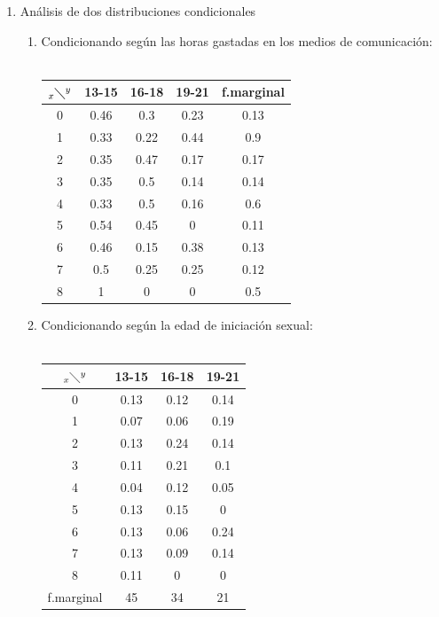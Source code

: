 \documentclass[letterpaper,spanish,11pt]{article}
\begin{document}
\begin{itemize}
\begin{enumerate}
\item An\'alisis de dos distribuciones condicionales\\
\begin{enumerate}
\item Condicionando seg\'un las horas gastadas en los medios de comunicaci\'on:\\\\
	\begin{tabular}[c]{|c|c c c|c|}
        \hline
        $_x\diagdown ^{y}$ & 13-15 & 16-18 & 19-21 & f.marginal \\
        \hline
        0 & 0.46 & 0.3 & 0.23 & 0.13 \\
        1 & 0.33 & 0.22 & 0.44 & 0.9 \\
        2 & 0.35 & 0.47 & 0.17 & 0.17 \\
        3 & 0.35 & 0.5 & 0.14 & 0.14 \\
        4 & 0.33 & 0.5 & 0.16 & 0.6 \\
        5 & 0.54 & 0.45 & 0 & 0.11 \\
        6 & 0.46 & 0.15 & 0.38 & 0.13\\
        7 & 0.5 & 0.25 & 0.25 & 0.12 \\
        8 & 1 & 0 & 0 & 0.5 \\
	\hline
        \end{tabular}

\item Condicionando seg\'un la edad de iniciaci\'on sexual:\\\\
        \begin{tabular}[c]{|c|c c c|}
        \hline
        $_x\diagdown ^{y}$ & 13-15 & 16-18 & 19-21 \\
        \hline
        0 & 0.13 & 0.12 & 0.14 \\
        1 & 0.07 & 0.06 & 0.19 \\
        2 & 0.13 & 0.24 & 0.14 \\
        3 & 0.11 & 0.21 & 0.1 \\
        4 & 0.04 & 0.12 & 0.05 \\
        5 & 0.13 & 0.15 & 0 \\
        6 & 0.13 & 0.06 & 0.24 \\
        7 & 0.13 & 0.09 & 0.14 \\
        8 & 0.11 & 0 & 0 \\
	\hline
        f.marginal & 45 & 34 & 21 \\
        \hline
        \end{tabular}
\\\\


\end{enumerate}
\end{enumerate}
\end{itemize}
\end{document}
